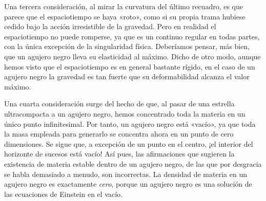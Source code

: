 Una tercera consideración, al mirar la curvatura del último recuadro, es que parece que el espaciotiempo se haya «roto», como si su propia trama hubiese cedido bajo la acción irresistible de la gravedad. Pero en realidad el espaciotiempo no puede romperse, ya que es un continuo regular en todas partes, con la única excepción de la singularidad física. Deberíamos pensar, más bien, que un agujero negro lleva su elasticidad al máximo. Dicho de otro modo, aunque hemos visto que el espaciotiempo es en general bastante rígido, en el caso de un agujero negro la gravedad es tan fuerte que su deformabilidad alcanza el valor máximo.

Una cuarta consideración surge del hecho de que, al pasar de una estrella ultracompacta a un agujero negro, hemos concentrado toda la materia en un único punto infinitesimal. Por tanto, un agujero negro está «vacío», ya que toda la masa empleada para generarlo se concentra ahora en un punto de cero dimensiones. Se sigue que, a excepción de un punto en el centro, ¡el interior del horizonte de sucesos está vacío! Así pues, las afirmaciones que sugieren la existencia de materia estable dentro de un agujero negro, de las que por desgracia se habla demasiado a menudo, son incorrectas. La densidad de materia en un agujero negro es exactamente \emph{cero}, porque un agujero negro es una solución de las ecuaciones de Einstein en el vacío.


